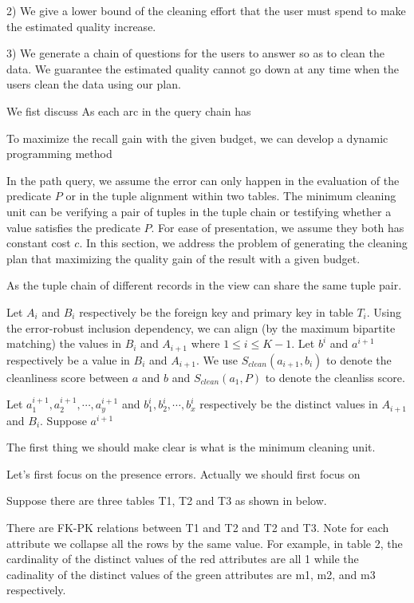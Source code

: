2) We give a lower bound of the cleaning effort that the user must spend to make the estimated quality increase.

3) We generate a chain of questions for the users to answer so as to clean the data. We guarantee the estimated quality cannot go down at any time when the users clean the data using our plan.


\iffalse
We fist discuss As each arc in the query chain has 

To maximize the recall gain with the given budget, we can develop a dynamic programming method


In the path query, we assume the error can only happen in the evaluation of the predicate $P$ or in the tuple alignment within two tables. The minimum cleaning unit can be verifying a pair of tuples in the tuple chain or testifying whether a value satisfies the predicate $P$. For ease of presentation, we assume they both has constant cost $c$. In this section, we address the problem of generating the cleaning plan that maximizing the quality gain of the result with a given budget.


As the tuple chain of different records in the view can share the same tuple pair. 




Let $A_i$ and $B_i$ respectively be the foreign key and primary key in table $T_i$. Using the error-robust inclusion dependency, we can align (by the maximum bipartite matching) the values in $B_i$ and $A_{i+1}$ where $1\leq i\leq K-1$. Let $b^i$ and $a^{i+1}$ respectively be a value in $B_i$ and $A_{i+1}$. We use $S_{clean}(a_{i+1},b_i)$ to denote the cleanliness score between $a$ and $b$ and $S_{clean}(a_1,P)$ to denote the cleanliss score.


Let $a^{i+1}_1, a^{i+1}_2, \cdots, a^{i+1}_y$ and $b^{i}_1, b^{i}_2, \cdots, b^{i}_x$ respectively be the distinct values in  $A_{i+1}$ and $B_i$. Suppose $a^{i+1}$


The first thing we should make clear is what is the minimum cleaning unit. 

Let’s first focus on the presence errors. Actually we should first focus on 

Suppose there are three tables T1, T2 and T3 as shown in below.


There are FK-PK relations between T1 and T2 and T2 and T3. Note for each attribute we collapse all the rows by the same value. For example, in table 2, the cardinality of the distinct values of the red attributes are all 1 while the cadinality of the distinct values of the green attributes are m1, m2, and m3 respectively.


